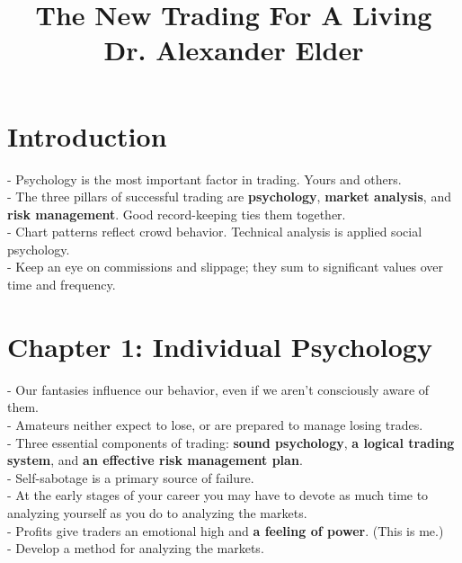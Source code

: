 \documentclass[12pt,fullpage]{article}
\begin{document}
\title{The New Trading For A Living\\Dr. Alexander Elder}
\maketitle

\newpage

\onehalfspace
\section*{Introduction}
- Psychology is the most important factor in trading. Yours and others.\\
- The three pillars of successful trading are \textbf{psychology}, \textbf{market analysis}, and \textbf{risk management}. Good record-keeping ties them together.\\
- Chart patterns reflect crowd behavior. Technical analysis is applied social psychology.\\
- Keep an eye on commissions and slippage; they sum to significant values over time and frequency.\\
\section*{Chapter 1: Individual Psychology}
- Our fantasies influence our behavior, even if we aren't consciously aware of them.\\
- Amateurs neither expect to lose, or are prepared to manage losing trades.\\
- Three essential components of trading: \textbf{sound psychology}, \textbf{a logical trading system}, and \textbf{an effective risk management plan}.\\
- Self-sabotage is a primary source of failure.\\
- At the early stages of your career you may have to devote as much time to analyzing yourself as you do to analyzing the markets.\\
- Profits give traders an emotional high and \textbf{a feeling of power}. (This is me.)\\
- Develop a method for analyzing the markets.\\
\end{document}
